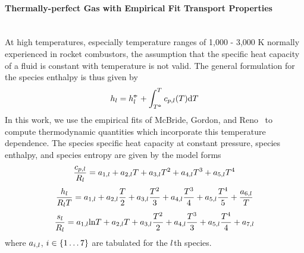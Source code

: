 \paragraph*{Thermally-perfect Gas with Empirical Fit Transport Properties}\mbox{}\\

At high temperatures, especially temperature ranges of 1,000 - 3,000 K normally experienced in rocket combustors, the assumption that the specific heat capacity of a fluid is constant with temperature is not valid. The general formulation for the species enthalpy is thus given by
%
\begin{eqnarray}
	h_{l} = h^{\circ\kern-0.47em-}_{l} + \int_{T^{\circ\kern-0.47em-}}^{T} c_{p,l}(T) \text{d}T
\end{eqnarray}
%
In this work, we use the empirical fits of McBride, Gordon, and Reno~\cite{McBride1993} to compute thermodynamic quantities which incorporate this temperature dependence. The species specific heat capacity at constant pressure, species enthalpy, and species entropy are given by the model forms
%
\begin{equation}
	\frac{c_{p,l}}{R_{l}} = a_{1,l} + a_{2,l} T + a_{3,l} T^2 + a_{4,l} T^3 + a_{5,l} T^4
\end{equation}
%
\begin{equation}
	\frac{h_{l}}{R_{l} T} = a_{1,l} + a_{2,l} \frac{T}{2} + a_{3,l} \frac{T^2}{3} + a_{4,l} \frac{T^3}{4} + a_{5,l} \frac{T^4}{5} + \frac{a_{6,l}}{T}
\end{equation}
%
\begin{equation}
	\frac{s_{l}}{R_{l}} = a_{1,l} \text{ln}T + a_{2,l} T + a_{3,l} \frac{T^2}{2} + a_{4,l} \frac{T^3}{3} + a_{5,l} \frac{T^4}{4} + a_{7,l}
\end{equation}
%
where $a_{i,l}$, $i \in \{1 \hdots 7\}$ are tabulated for the $l$th species.

